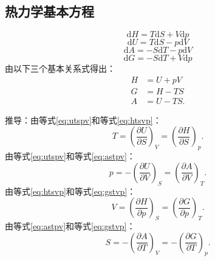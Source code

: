 \subsection{热力学基本方程}%
\label{sub:热力学基本方程}
\begin{equation}
    \label{eq:htsvp}
    \mathrm{d}H = T\mathrm{d}S + V\mathrm{d}p
\end{equation}
\begin{equation}
    \label{eq:utspv}
    \mathrm{d}U = T\mathrm{d}S - p\mathrm{d}V
\end{equation}
\begin{equation}
    \label{eq:astpv}
    \mathrm{d}A = -S\mathrm{d}T - p\mathrm{d}V
\end{equation}
\begin{equation}
    \label{eq:gstvp}
    \mathrm{d}G = -S\mathrm{d}T + V\mathrm{d}p
\end{equation}
由以下三个基本关系式得出：
\begin{align*}
    H&= U+pV \\
    G&= H-TS \\
    A&= U-TS
.\end{align*}
\begin{notation}
    推导：由等式\ref{eq:utspv}和等式\ref{eq:htsvp}：\[
        T = \left(\frac{\partial U}{\partial S}\right)_{V} = \left(\frac{\partial H}{\partial S}\right)_{p}
    .\]
    由等式\ref{eq:utspv}和等式\ref{eq:astpv}：
    \[
        p = -\left(\frac{\partial U}{\partial V}\right)_{S} = \left(\frac{\partial A}{\partial V}\right)_{T}
    .\]
    由等式\ref{eq:htsvp}和等式\ref{eq:gstvp}：\[
        V = \left(\frac{\partial H}{\partial p}\right)_{S} = \left(\frac{\partial G}{\partial p}\right)_{T}
    .\]
    由等式\ref{eq:astpv}和等式\ref{eq:gstvp}：
    \[
        S = -\left(\frac{\partial A}{\partial T}\right)_{V} = -\left(\frac{\partial G}{\partial T}\right)_{p}
    .\]
\end{notation}
